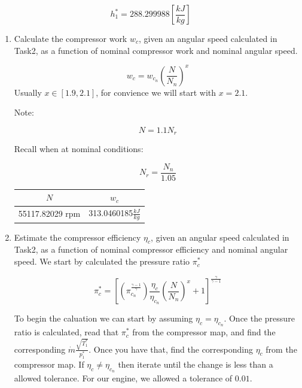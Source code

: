 \documentclass[titlepage]{article}
\begin{document}
  \begin{equation}
    h_{1}^{*} = 288.299988 \left[\frac{kJ}{kg}\right]
  \end{equation}
  
  \begin{enumerate}
    \item Calculate the compressor work $w_{c}$, given an angular speed calculated
    in Task2, as a function of nominal compressor work and nominal angular speed.
  
    \begin{equation}
      w_{c} = w_{c_{n}} \left( \frac{N}{N_{n}} \right)^{x}
    \end{equation}
    Usually $x \in [1.9, 2.1]$, for convience we will start with $x = 2.1$.
  
    Note: 
  
    \begin{equation}
      N = 1.1N_{r}
    \end{equation}
  
    Recall when at nominal conditions:
  
    \begin{equation}
      N_{r} = \frac{N_{n}}{1.05}
    \end{equation}
  
    \begin{center}
      \begin{tabular}{|c|c|}
        \hline
        $N$ & $w_{c}$ \\
        \hline
        55117.82029 rpm & 313.0460185$\frac{kJ}{kg}$ \\
        \hline
      \end{tabular}
    \end{center}
  
    \item Estimate the compressor efficiency $\eta_{c}$, given an angular 
    speed calculated in Task2, as a function of nominal compressor efficiency and
    nominal angular speed. We start by calculated the pressure ratio $\pi_{c}^{*}$
  
    \begin{equation}
      \pi_{c}^{*} = \left[ \left(\pi_{c_{n}}^{\frac{\gamma-1}{\gamma}}\right)
      \frac{\eta_{c}}{\eta_{c_{n}}} \left(\frac{N}{N_{n}}\right)^{x} +1 \right]^{\frac{\gamma}{\gamma-1}}
    \end{equation}
  
    To begin the caluation we can start by assuming $\eta_{c} = \eta_{c_{n}}$. Once
    the pressure ratio is calculated, read that $\pi_{c}^{*}$ from the compressor map, 
    and find the corresponding $\dot{m}\frac{\sqrt{T_{1}^{*}}}{p_{1}^{*}}$. Once you have 
    that, find the corresponding $\eta_{c}$ from the compressor map. If $\eta_{c} \neq \eta_{c_{n}}$ 
    then iterate until the change is less than a allowed tolerance. For our engine,
    we allowed a tolerance of $0.01$.
  

\end{enumerate}
\end{document}
